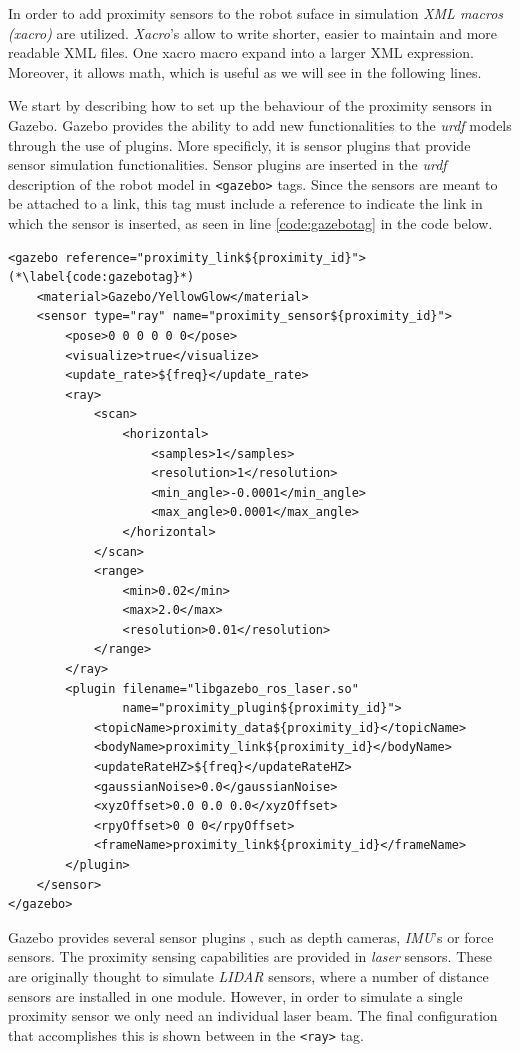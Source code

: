 In order to add proximity sensors to the robot suface in simulation \textit{XML macros (xacro)} are utilized. \textit{Xacro}'s allow to write shorter, easier to maintain and more readable XML files. One xacro macro expand into a larger XML expression. Moreover, it allows math, which is useful as we will see in the following lines.

We start by describing how to set up the behaviour of the proximity sensors in Gazebo. Gazebo provides the ability to add new functionalities to the \textit{urdf} models through the use of plugins. More specificly, it is sensor plugins that provide sensor simulation functionalities. Sensor plugins are inserted in the \textit{urdf} description of the robot model in \lstinline[columns=fixed]{<gazebo>} tags. Since the sensors are meant to be attached to a link, this tag must include a reference to indicate the link in which the sensor is inserted, as seen in line \ref{code:gazebotag} in the code below.

\begin{lstlisting}[caption={Setting up a ray sensor for Gazebo simulation.},captionpos=b]
<gazebo reference="proximity_link${proximity_id}"> (*\label{code:gazebotag}*)
    <material>Gazebo/YellowGlow</material>
    <sensor type="ray" name="proximity_sensor${proximity_id}">
        <pose>0 0 0 0 0 0</pose>
        <visualize>true</visualize>
        <update_rate>${freq}</update_rate>
        <ray>
            <scan>
                <horizontal>
                    <samples>1</samples>
                    <resolution>1</resolution>
                    <min_angle>-0.0001</min_angle>
                    <max_angle>0.0001</max_angle>
                </horizontal>
            </scan>
            <range>
                <min>0.02</min>
                <max>2.0</max>
                <resolution>0.01</resolution>
            </range>
        </ray>
        <plugin filename="libgazebo_ros_laser.so"
                name="proximity_plugin${proximity_id}">
            <topicName>proximity_data${proximity_id}</topicName>
            <bodyName>proximity_link${proximity_id}</bodyName>
            <updateRateHZ>${freq}</updateRateHZ>
            <gaussianNoise>0.0</gaussianNoise>
            <xyzOffset>0.0 0.0 0.0</xyzOffset>
            <rpyOffset>0 0 0</rpyOffset>
            <frameName>proximity_link${proximity_id}</frameName>
        </plugin>
    </sensor>
</gazebo>
\end{lstlisting}

Gazebo provides several sensor plugins \cite{gazeboplugins}, such as depth cameras, \textit{IMU}'s or force sensors. The proximity sensing capabilities are provided in \textit{laser} sensors. These are originally thought to simulate \textit{LIDAR} sensors, where a number of distance sensors are installed in one module. However, in order to simulate a single proximity sensor we only need an individual laser beam. The final configuration that accomplishes this is shown between in the \lstinline[columns=fixed]{<ray>} tag.


